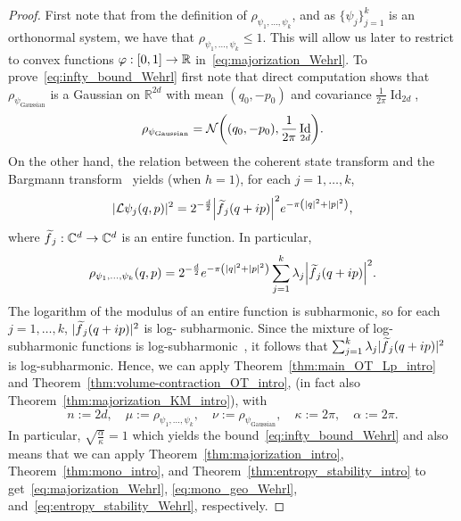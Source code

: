 \documentclass[10pt]{amsart}
\theoremstyle{definition}\newtheorem{defi}[theo]{Definition}\newtheorem{rema}[theo]{Remark}\newtheorem{exam}[theo]{Example}\newtheorem{exem}[theo]{Example}\newtheorem{nota}[theo]{Notation}
\newcommand{\R}{\mathbb R}
\newcommand{\C}{\mathbb C}
\DeclareMathOperator{\Id}{Id}
\newcommand{\dd}{n}
\newcommand{\prob}{\rho}
\newcommand{\source}{\mu}
\newcommand{\target}{\nu}
\newcommand{\lsh}{\alpha}
\newcommand{\lc}{\kappa}
\newcommand{\cotrans}{\mathcal L}
\newcommand{\clN}{\mathcal{N}}
\newcommand{\wave}{\psi}
\newcommand{\waveg}{\psi_{\mathrm{Gaussian}}}
\newcommand{\cxfun}{\varphi}
\renewcommand*{\to}{\mathchoice{\longrightarrow}{\rightarrow}{\rightarrow}{\rightarrow}}
\let\originalleft\left
\let\originalright\right
\renewcommand{\left}{\mathopen{}\mathclose\bgroup\originalleft}
\renewcommand{\right}{\aftergroup\egroup\originalright}
\let\oldtilde\tilde
\renewcommand*{\tilde}[1]{\mathchoice{\widetilde{#1}}{\widetilde{#1}}{\oldtilde{#1}}{\oldtilde{#1}}}
\begin{document}
\begin{proof}
First note that from the definition of $\prob_{\wave_1,\ldots,\wave_k}$, and as $\{\wave_j\}_{j=1}^k$ is an orthonormal system, we have that $\prob_{\wave_1,\ldots,\wave_k}\le 1$. This will allow us later to restrict to convex functions $\cxfun:[0,1]\to \R$ in~\eqref{eq:majorization_Wehrl}. To prove~\eqref{eq:infty_bound_Wehrl} first note that direct computation shows that $\prob_{\waveg}$ is a Gaussian on $\R^{2d}$ with mean $(q_0,-p_0)$ and covariance $\frac{1}{2\pi}\Id_{2d}$,
\[
\prob_{\waveg}=\clN\left((q_0,-p_0),\frac{1}{2\pi}\Id_{2d}\right).
\]
On the other hand, the relation between the coherent state transform and the Bargmann transform~\cite[Proposition~3.4.1]{grochenig2001foundations} yields (when $h=1$), for each $j=1,\ldots,k$,
\begin{equation}\label{eq:STFT_Bargmann_j}
|\cotrans\wave_j(q,p)|^2=2^{-\frac{d}{2}}\left|\tilde f_j(q+ip)\right|^2e^{-\pi\left(|q|^2+|p|^2\right)},
\end{equation}
where $\tilde f_j:\C^{d}\to \C^{d}$ is an entire function. In particular,
\begin{equation}\label{eq:STFT_Bargmann}
\prob_{\wave_1,\ldots,\wave_k}(q,p)=2^{-\frac{d}{2}}e^{-\pi\left(|q|^2+|p|^2\right)}\sum_{j=1}^k\lambda_j\left|\tilde f_j(q+ip)\right|^2.
\end{equation}
The logarithm of the modulus of an entire function is subharmonic, so for each $j=1,\ldots, k$, $\lvert\tilde f_j(q+ip)\rvert^2$ is log- subharmonic. Since the mixture of log-subharmonic fun\-ctions is log-subharmonic~\cite[Proposition~2.2]{MR2578455}, it follows that $\sum_{j=1}^k\lambda_j\lvert\tilde f_j(q+ip)\rvert^2$ is log-subharmonic. Hence, we can apply Theorem~\ref{thm:main_OT_Lp_intro} and Theorem~\ref{thm:volume-contraction_OT_intro}, (in fact also Theorem~\ref{thm:majorization_KM_intro}), with
\[
\dd:=2d,\quad \source:=\prob_{\wave_1,\ldots,\wave_k},\quad\target:=\prob_{\waveg},\quad \lc:=2\pi,\quad \lsh:=2\pi.
\]
In particular, $\sqrt{ \frac{\lsh}{\lc}}=1$ which yields the bound~\eqref{eq:infty_bound_Wehrl} and also means that we can apply Theorem~\ref{thm:majorization_intro}, Theorem~\ref{thm:mono_intro}, and Theorem~\ref{thm:entropy_stability_intro} to get~\eqref{eq:majorization_Wehrl}, \eqref{eq:mono_geo_Wehrl}, and~\eqref{eq:entropy_stability_Wehrl}, respectively.
\end{proof}
\end{document}
